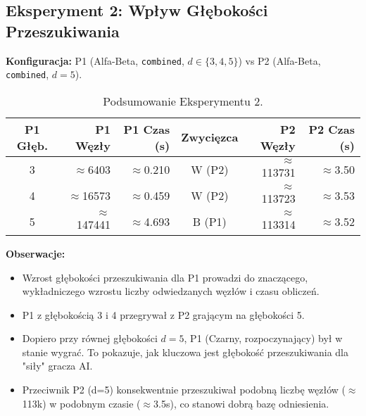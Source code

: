 \documentclass[12pt,a4paper]{article}
\newcommand{\code}[1]{\texttt{#1}} %
\begin{document}
\subsection{Eksperyment 2: Wpływ Głębokości Przeszukiwania}
\textbf{Konfiguracja:} P1 (Alfa-Beta, \code{combined}, $d \in \{3,4,5\}$) vs P2 (Alfa-Beta, \code{combined}, $d=5$).
\begin{table}[H]
    \centering
    \caption{Podsumowanie Eksperymentu 2.}
    \begin{tabular}{crrcrr}
        \toprule
        P1 Głęb. & P1 Węzły & P1 Czas (s) & Zwycięzca & P2 Węzły & P2 Czas (s) \\
        \midrule
        3 & $\approx$6403  & $\approx$0.210 & W (P2) & $\approx$113731 & $\approx$3.50 \\
        4 & $\approx$16573 & $\approx$0.459 & W (P2) & $\approx$113723 & $\approx$3.53 \\
        5 & $\approx$147441& $\approx$4.693 & B (P1) & $\approx$113314 & $\approx$3.52 \\
        \bottomrule
    \end{tabular}
    \label{tab:e2_summary}
\end{table}
\textbf{Obserwacje:}
\begin{itemize}
    \item Wzrost głębokości przeszukiwania dla P1 prowadzi do znaczącego, wykładniczego wzrostu liczby odwiedzanych węzłów i czasu obliczeń.
    \item P1 z głębokością 3 i 4 przegrywał z P2 grającym na głębokości 5.
    \item Dopiero przy równej głębokości $d=5$, P1 (Czarny, rozpoczynający) był w stanie wygrać. To pokazuje, jak kluczowa jest głębokość przeszukiwania dla "siły" gracza AI.
    \item Przeciwnik P2 (d=5) konsekwentnie przeszukiwał podobną liczbę węzłów ($\approx$113k) w podobnym czasie ($\approx$3.5s), co stanowi dobrą bazę odniesienia.
\end{itemize}
\end{document}
